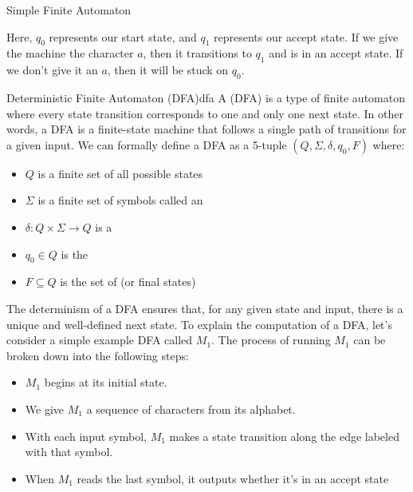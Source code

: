 \documentclass[12pt]{report}
\begin{document}
\begin{exbox}{Simple Finite Automaton}{}
    \begin{center}\end{center}
    Here, $q_0$ represents our start state, and $q_1$ represents our accept state. If we give the machine the character $a$, then it transitions to $q_1$ and is in an accept state. If we don't give it an $a$, then it will be stuck on $q_0$.
\end{exbox}

\begin{dfnbox}{Deterministic Finite Automaton (DFA)}{dfa}
    A  (DFA) is a type of finite automaton where every state transition corresponds to one and only one next state. In other words, a DFA is a finite-state machine that follows a single path of transitions for a given input.
    \tcblower
    We can formally define a DFA as a 5-tuple $(Q, \Sigma, \delta, q_0, F)$ where:
    \begin{itemize}[noitemsep]
        \item $Q$ is a finite set of all possible states
        \item $\Sigma$ is a finite set of symbols called an 
        \item $\delta : Q \times \Sigma \to Q$ is a 
        \item $q_0 \in Q$ is the 
        \item $F \subseteq Q$ is the set of  (or final states)
    \end{itemize}
\end{dfnbox}

The determinism of a DFA ensures that, for any given state and input, there is a unique and well-defined next state. To explain the computation of a DFA, let's consider a simple example DFA called $M_1$. The process of running $M_1$ can be broken down into the following steps:
\begin{itemize}[noitemsep]
    \item $M_1$ begins at its initial state.
    \item We give $M_1$ a sequence of characters from its alphabet.
    \item With each input symbol, $M_1$ makes a state transition along the edge labeled with that symbol.
    \item When $M_1$ reads the last symbol, it outputs whether it's in an accept state
\end{itemize}
\end{document}
